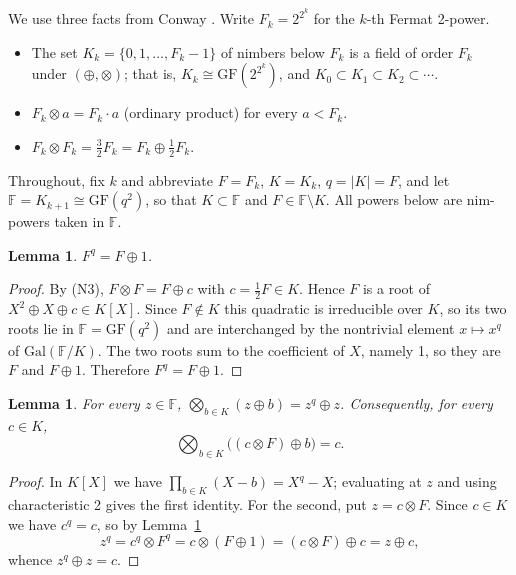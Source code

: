 \documentclass[11pt,a4paper]{article}
\theoremstyle{plain}
\newtheorem{lemma}[theorem]{Lemma}
\theoremstyle{definition}
\begin{document}
We use three facts from Conway \cite[Ch.~6]{conway}. Write $F_{k}=2^{2^{k}}$ for the $k$-th
Fermat 2-power.

\begin{itemize}
\item[(N1)] The set $K_{k}=\{0,1,\dots,F_{k}-1\}$ of nimbers below $F_{k}$ is a field of
order $F_{k}$ under $(\oplus,\otimes)$; that is, $K_{k}\cong\mathrm{GF}(2^{2^{k}})$, and
$K_{0}\subset K_{1}\subset K_{2}\subset\cdots$.
\item[(N2)] $F_{k}\otimes a=F_{k}\cdot a$ (ordinary product) for every $a<F_{k}$.
\item[(N3)] $F_{k}\otimes F_{k}=\tfrac32F_{k}=F_{k}\oplus\tfrac12F_{k}$.
\end{itemize}

Throughout, fix $k$ and abbreviate $F=F_{k}$, $K=K_{k}$, $q=|K|=F$, and let
$\mathbb{F}=K_{k+1}\cong\mathrm{GF}(q^{2})$, so that $K\subset\mathbb{F}$ and
$F\in\mathbb{F}\setminus K$. All powers below are nim-powers taken in $\mathbb{F}$.

\begin{lemma}\label{lem:frob}
$F^{q}=F\oplus1$.
\end{lemma}

\begin{proof}
By (N3), $F\otimes F=F\oplus c$ with $c=\tfrac12F\in K$. Hence $F$ is a root of
$X^{2}\oplus X\oplus c\in K[X]$. Since $F\notin K$ this quadratic is irreducible over $K$,
so its two roots lie in $\mathbb{F}=\mathrm{GF}(q^{2})$ and are interchanged by the
nontrivial element $x\mapsto x^{q}$ of $\mathrm{Gal}(\mathbb{F}/K)$. The two roots sum to
the coefficient of $X$, namely 1, so they are $F$ and $F\oplus1$. Therefore
$F^{q}=F\oplus1$.
\end{proof}

\begin{lemma}\label{lem:coset}
For every $z\in\mathbb{F}$, $\bigotimes_{b\in K}(z\oplus b)=z^{q}\oplus z$. Consequently,
for every $c\in K$,
\[
  \bigotimes_{b\in K}\bigl((c\otimes F)\oplus b\bigr)=c.
\]
\end{lemma}

\begin{proof}
In $K[X]$ we have $\prod_{b\in K}(X-b)=X^{q}-X$; evaluating at $z$ and using characteristic
2 gives the first identity. For the second, put $z=c\otimes F$. Since $c\in K$ we have
$c^{q}=c$, so by Lemma~\ref{lem:frob}
\[
  z^{q}=c^{q}\otimes F^{q}=c\otimes(F\oplus1)=(c\otimes F)\oplus c=z\oplus c,
\]
whence $z^{q}\oplus z=c$.
\end{proof}
\end{document}
